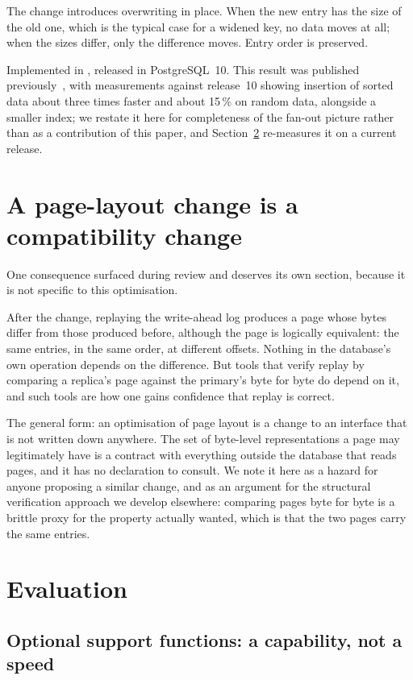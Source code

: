 The change introduces overwriting in place. When the new entry has the size of
the old one, which is the typical case for a widened key, no data moves at all;
when the sizes differ, only the difference moves. Entry order is preserved.

Implemented in , released in PostgreSQL~10. This result was
published previously~\cite{borodin2017memory}, with measurements against
release~10 showing insertion of sorted data about three times faster and about
15\,\% on random data, alongside a smaller index; we restate it here for
completeness of the fan-out picture rather than as a contribution of this paper,
and Section~\ref{sec:eval} re-measures it on a current release.

\section{A page-layout change is a compatibility change}
\label{sec:bytes}

One consequence surfaced during review and deserves its own section, because it
is not specific to this optimisation.

After the change, replaying the write-ahead log produces a page whose bytes
differ from those produced before, although the page is logically equivalent:
the same entries, in the same order, at different offsets. Nothing in the
database's own operation depends on the difference. But tools that verify replay
by comparing a replica's page against the primary's byte for byte do depend on
it, and such tools are how one gains confidence that replay is correct.

The general form: an optimisation of page layout is a change to an interface that
is not written down anywhere. The set of byte-level representations a page may
legitimately have is a contract with everything outside the database that reads
pages, and it has no declaration to consult. We note it here as a hazard for
anyone proposing a similar change, and as an argument for the structural
verification approach we develop elsewhere: comparing pages byte for byte is a
brittle proxy for the property actually wanted, which is that the two pages carry
the same entries.

\section{Evaluation}
\label{sec:eval}

\subsection{Optional support functions: a capability, not a speed}

